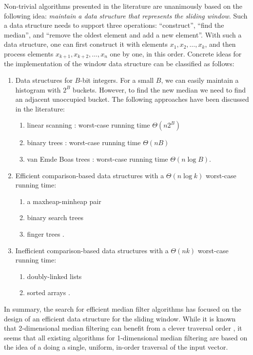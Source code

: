 \documentclass[a4paper,11pt]{article}
\begin{document}
Non-trivial algorithms presented in the literature are unanimously based on the following idea: \emph{maintain a data structure that represents the sliding window}. Such a data structure needs to support three operations: ``construct'', ``find the median'', and ``remove the oldest element and add a new element''. With such a data structure, one can first construct it with elements $x_1, x_2, \dotsc, x_k$, and then process elements $x_{k+1}, x_{k+2}, \dotsc, x_n$ one by one, in this order. Concrete ideas for the implementation of the window data structure can be classified as follows:
\begin{enumerate}
    \item Data structures for $B$-bit integers. For a small $B$, we can easily maintain a histogram with $2^B$ buckets. However, to find the new median we need to find an adjacent unoccupied bucket. The following approaches have been discussed in the literature:
    \begin{enumerate}[noitemsep]
        \item linear scanning \cite{huang79median,ateman80median,juhola91comparison}: worst-case running time $\Theta(n 2^B)$
        \item binary trees \cite{ateman80median,juhola91comparison}: worst-case running time $\Theta(n B)$
        \item van Emde Boas trees \cite{juhola91comparison}: worst-case running time $\Theta(n \log B)$.
    \end{enumerate}
    \item Efficient comparison-based data structures with a $\Theta(n \log k)$ worst-case running time:
    \begin{enumerate}[noitemsep]
        \item a maxheap-minheap pair \cite{astola89median,juhola91comparison,hardle95median-smooth}
        \item binary search trees \cite{juhola91comparison}
        \item finger trees \cite{juhola91comparison}.
    \end{enumerate}
    \item Inefficient comparison-based data structures with a $\Theta(n k)$ worst-case running time:
    \begin{enumerate}[noitemsep]
        \item doubly-linked lists \cite{juhola91comparison}
        \item sorted arrays \cite{ahmad87median,juhola91comparison}.
    \end{enumerate}
\end{enumerate}
In summary, the search for efficient median filter algorithms has focused on the design of an efficient data structure for the sliding window. While it is known that 2-dimensional median filtering can benefit from a clever traversal order \cite{perreault07median}, it seems that all existing algorithms for 1-dimensional median filtering are based on the idea of a doing a single, uniform, in-order traversal of the input vector.
\end{document}
